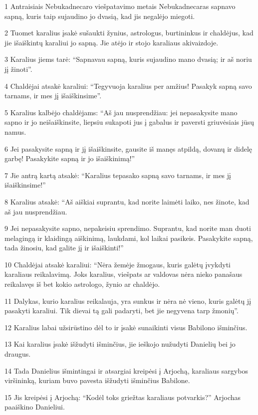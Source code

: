 \par 1 Antraisiais Nebukadnecaro viešpatavimo metais Nebukadnecaras sapnavo sapną, kuris taip sujaudino jo dvasią, kad jis negalėjo miegoti. 
\par 2 Tuomet karalius įsakė sušaukti žynius, astrologus, burtininkus ir chaldėjus, kad jie išaiškintų karaliui jo sapną. Jie atėjo ir stojo karaliaus akivaizdoje. 
\par 3 Karalius jiems tarė: “Sapnavau sapną, kuris sujaudino mano dvasią; ir aš noriu jį žinoti”. 
\par 4 Chaldėjai atsakė karaliui: “Tegyvuoja karalius per amžius! Pasakyk sapną savo tarnams, ir mes jį išaiškinsime”. 
\par 5 Karalius kalbėjo chaldėjams: “Aš jau nusprendžiau: jei nepasakysite mano sapno ir jo neišaiškinsite, liepsiu sukapoti jus į gabalus ir paversti griuvėsiais jūsų namus. 
\par 6 Jei pasakysite sapną ir jį išaiškinsite, gausite iš manęs atpildą, dovanų ir didelę garbę! Pasakykite sapną ir jo išaiškinimą!” 
\par 7 Jie antrą kartą atsakė: “Karalius tepasako sapną savo tarnams, ir mes jį išaiškinsime!” 
\par 8 Karalius atsakė: “Aš aiškiai suprantu, kad norite laimėti laiko, nes žinote, kad aš jau nusprendžiau. 
\par 9 Jei nepasakysite sapno, nepakeisiu sprendimo. Suprantu, kad norite man duoti melagingą ir klaidingą aiškinimą, laukdami, kol laikai pasikeis. Pasakykite sapną, tada žinosiu, kad galite jį ir išaiškinti!” 
\par 10 Chaldėjai atsakė karaliui: “Nėra žemėje žmogaus, kuris galėtų įvykdyti karaliaus reikalavimą. Joks karalius, viešpats ar valdovas nėra nieko panašaus reikalavęs iš bet kokio astrologo, žynio ar chaldėjo. 
\par 11 Dalykas, kurio karalius reikalauja, yra sunkus ir nėra nė vieno, kuris galėtų jį pasakyti karaliui. Tik dievai tą gali padaryti, bet jie negyvena tarp žmonių”. 
\par 12 Karalius labai užsirūstino dėl to ir įsakė sunaikinti visus Babilono išminčius. 
\par 13 Kai karalius įsakė išžudyti išminčius, jie ieškojo nužudyti Danielių bei jo draugus. 
\par 14 Tada Danielius išmintingai ir atsargiai kreipėsi į Arjochą, karaliaus sargybos viršininką, kuriam buvo pavesta išžudyti išminčius Babilone. 
\par 15 Jis kreipėsi į Arjochą: “Kodėl toks griežtas karaliaus potvarkis?” Arjochas paaiškino Danieliui. 
